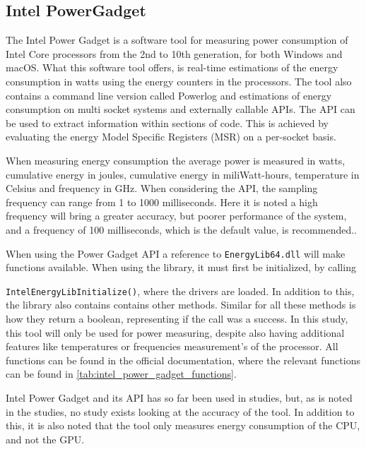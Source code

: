 \subsection{Intel PowerGadget}

The Intel Power Gadget\cite[]{powergadget} is a software tool for measuring power consumption of Intel Core processors from the 2nd to 10th generation, for both Windows and macOS. What this software tool offers, is real-time  estimations of the energy consumption in watts using the energy counters in the processors. 
The tool also contains a command line version called Powerlog and estimations of energy consumption on multi socket systems and externally callable APIs. The API can be used to extract information within sections of code. This is achieved by evaluating the energy Model Specific Registers (MSR) on a per-socket basis.

When measuring energy consumption the average power is measured in watts, cumulative energy in joules, cumulative energy in miliWatt-hours, temperature in Celsius and frequency in GHz. When considering the API, the sampling frequency can range from 1 to 1000 milliseconds. Here it is noted a high frequency will bring a greater accuracy, but poorer performance of the system, and a frequency of 100 milliseconds, which is the default value, is recommended.\cite[]{powergadget_api}.

When using the Power Gadget API a reference to \texttt{EnergyLib64.dll} will make functions available. When using the library, it must first be initialized, by calling 

\texttt{IntelEnergyLibInitialize()}, where the drivers are loaded. In addition to this, the library also contains contains other methods. Similar for all these methods is how they return a boolean, representing if the call was a success. In this study, this tool will only be used for power measuring, despite also having additional features like temperatures or frequencies measurement's of the processor. All functions can be found in the official documentation\cite[]{powergadget_api}, where the relevant functions can be found in \cref{tab:intel_power_gadget_functions}.

Intel Power Gadget and its API has so far been used in studies\cite[]{Bruce2015ReducingEC, Ozturk2019, Unlu2021}, but, as is noted in the studies, no study exists looking at the accuracy of the tool. In addition to this, it is also noted that the tool only measures energy consumption of the CPU, and not the GPU.

